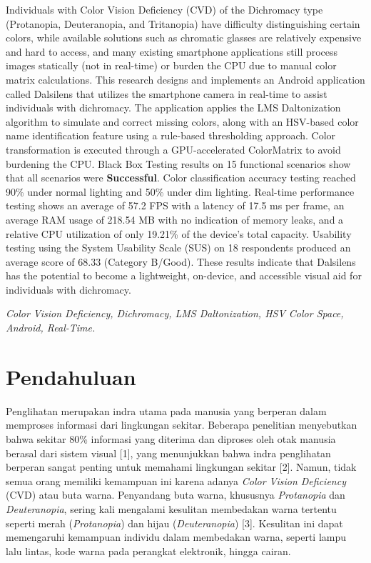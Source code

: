 \noindent\fontsize{10}{12}\selectfont
Individuals with Color Vision Deficiency (CVD) of the Dichromacy type (Protanopia, Deuteranopia, and Tritanopia) have difficulty distinguishing certain colors, while available solutions such as chromatic glasses are relatively expensive and hard to access, and many existing smartphone applications still process images statically (not in real-time) or burden the CPU due to manual color matrix calculations. This research designs and implements an Android application called Dalsilens that utilizes the smartphone camera in real-time to assist individuals with dichromacy. The application applies the LMS Daltonization algorithm to simulate and correct missing colors, along with an HSV-based color name identification feature using a rule-based thresholding approach. Color transformation is executed through a GPU-accelerated ColorMatrix to avoid burdening the CPU. Black Box Testing results on 15 functional scenarios show that all scenarios were \textbf{Successful}. Color classification accuracy testing reached 90\% under normal lighting and 50\% under dim lighting. Real-time performance testing shows an average of 57.2 FPS with a latency of 17.5 ms per frame, an average RAM usage of 218.54 MB with no indication of memory leaks, and a relative CPU utilization of only 19.21\% of the device's total capacity. Usability testing using the System Usability Scale (SUS) on 18 respondents produced an average score of 68.33 (Category B/Good). These results indicate that Dalsilens has the potential to become a lightweight, on-device, and accessible visual aid for individuals with dichromacy.

\vspace{0.6em}
 \textit{\fontsize{10}{12}\selectfont Color Vision Deficiency, Dichromacy, LMS Daltonization, HSV Color Space, Android, Real-Time.}

\vspace{1em}

\twocolumn

\section{Pendahuluan}

Penglihatan merupakan indra utama pada manusia yang berperan dalam memproses informasi dari lingkungan sekitar. Beberapa penelitian menyebutkan bahwa sekitar 80\% informasi yang diterima dan diproses oleh otak manusia berasal dari sistem visual [1], yang menunjukkan bahwa indra penglihatan berperan sangat penting untuk memahami lingkungan sekitar [2]. Namun, tidak semua orang memiliki kemampuan ini karena adanya \textit{Color Vision Deficiency} (CVD) atau buta warna. Penyandang buta warna, khususnya \textit{Protanopia} dan \textit{Deuteranopia}, sering kali mengalami kesulitan membedakan warna tertentu seperti merah (\textit{Protanopia}) dan hijau (\textit{Deuteranopia}) [3]. Kesulitan ini dapat memengaruhi kemampuan individu dalam membedakan warna, seperti lampu lalu lintas, kode warna pada perangkat elektronik, hingga cairan.

